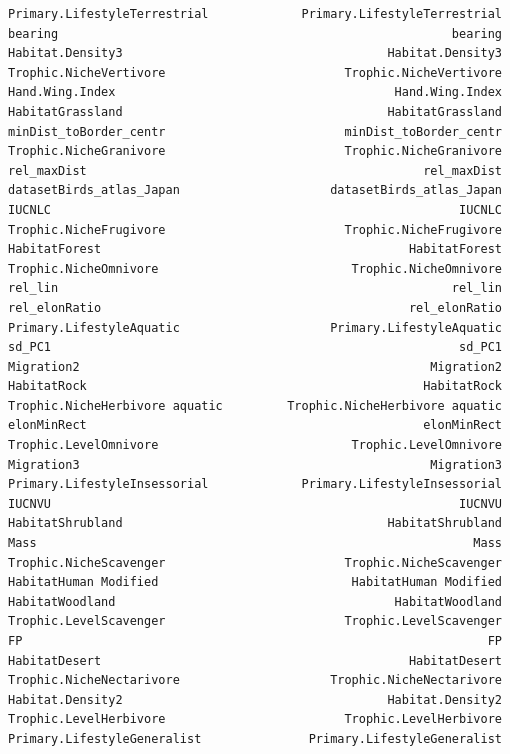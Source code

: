 \documentclass[
  letterpaper,
  DIV=11,
  numbers=noendperiod]{scrreprt}
\begin{document}
\begin{verbatim}
Primary.LifestyleTerrestrial             Primary.LifestyleTerrestrial
bearing                                                       bearing
Habitat.Density3                                     Habitat.Density3
Trophic.NicheVertivore                         Trophic.NicheVertivore
Hand.Wing.Index                                       Hand.Wing.Index
HabitatGrassland                                     HabitatGrassland
minDist_toBorder_centr                         minDist_toBorder_centr
Trophic.NicheGranivore                         Trophic.NicheGranivore
rel_maxDist                                               rel_maxDist
datasetBirds_atlas_Japan                     datasetBirds_atlas_Japan
IUCNLC                                                         IUCNLC
Trophic.NicheFrugivore                         Trophic.NicheFrugivore
HabitatForest                                           HabitatForest
Trophic.NicheOmnivore                           Trophic.NicheOmnivore
rel_lin                                                       rel_lin
rel_elonRatio                                           rel_elonRatio
Primary.LifestyleAquatic                     Primary.LifestyleAquatic
sd_PC1                                                         sd_PC1
Migration2                                                 Migration2
HabitatRock                                               HabitatRock
Trophic.NicheHerbivore aquatic         Trophic.NicheHerbivore aquatic
elonMinRect                                               elonMinRect
Trophic.LevelOmnivore                           Trophic.LevelOmnivore
Migration3                                                 Migration3
Primary.LifestyleInsessorial             Primary.LifestyleInsessorial
IUCNVU                                                         IUCNVU
HabitatShrubland                                     HabitatShrubland
Mass                                                             Mass
Trophic.NicheScavenger                         Trophic.NicheScavenger
HabitatHuman Modified                           HabitatHuman Modified
HabitatWoodland                                       HabitatWoodland
Trophic.LevelScavenger                         Trophic.LevelScavenger
FP                                                                 FP
HabitatDesert                                           HabitatDesert
Trophic.NicheNectarivore                     Trophic.NicheNectarivore
Habitat.Density2                                     Habitat.Density2
Trophic.LevelHerbivore                         Trophic.LevelHerbivore
Primary.LifestyleGeneralist               Primary.LifestyleGeneralist

\end{verbatim}
\end{document}
